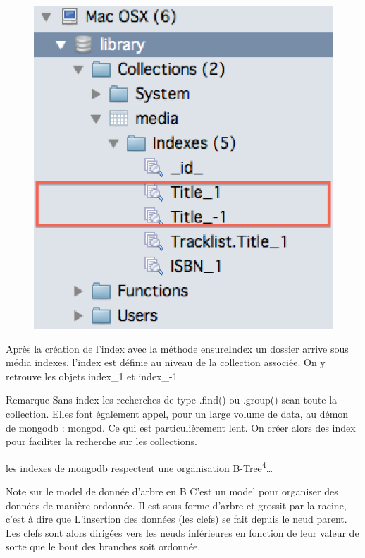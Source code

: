 \begin{figure}
\includegraphics[scale=0.3]{img/indexes.png}
\end{figure}
    \par
    Après la création de l’index avec la méthode ensureIndex un dossier arrive sous média indexes, l’index est définie au niveau de la collection associée. On y retrouve les objets index\_1 et index\_-1
    \begin{block}{Remarque}
        Sans index les recherches de type .find() ou .group() scan toute la collection. Elles font également appel, pour un large volume de data, au démon de mongodb : mongod. Ce qui est particulièrement lent. On créer alors des index pour faciliter la recherche sur les collections.
    \end{block}
    les indexes de mongodb respectent une organisation B-Tree\textsuperscript{4}… 
    \begin{block}{Note sur le model de donnée d'arbre en B}
    \newline
    C'est un model pour organiser des données de manière ordonnée. Il est sous forme d'arbre et grossit par la racine, c'est à dire que L’insertion des données (les clefs) se fait depuis le neud parent. Les clefs sont alors dirigées vers les neuds inférieures en fonction de leur valeur de sorte que le bout des branches soit ordonnée.    
    \end{block}
